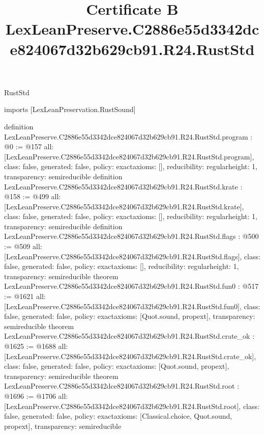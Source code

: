 \begin{lexlean}{RustStd}
\title{Certificate B LexLeanPreserve.C2886e55d3342dce824067d32b629cb91.R24.RustStd}
\begin{coremodule}
imports [LexLeanPreservation.RustSound]

definition LexLeanPreserve.C2886e55d3342dce824067d32b629cb91.R24.RustStd.program : @0 := @157 {
  all: [LexLeanPreserve.C2886e55d3342dce824067d32b629cb91.R24.RustStd.program],
  class: false,
  generated: false,
  policy: exact{axioms: []},
  reducibility: regular{height: 1},
  transparency: semireducible
}
definition LexLeanPreserve.C2886e55d3342dce824067d32b629cb91.R24.RustStd.krate : @158 := @499 {
  all: [LexLeanPreserve.C2886e55d3342dce824067d32b629cb91.R24.RustStd.krate],
  class: false,
  generated: false,
  policy: exact{axioms: []},
  reducibility: regular{height: 1},
  transparency: semireducible
}
definition LexLeanPreserve.C2886e55d3342dce824067d32b629cb91.R24.RustStd.flags : @500 := @509 {
  all: [LexLeanPreserve.C2886e55d3342dce824067d32b629cb91.R24.RustStd.flags],
  class: false,
  generated: false,
  policy: exact{axioms: []},
  reducibility: regular{height: 1},
  transparency: semireducible
}
theorem LexLeanPreserve.C2886e55d3342dce824067d32b629cb91.R24.RustStd.fun0 : @517 := @1621 {
  all: [LexLeanPreserve.C2886e55d3342dce824067d32b629cb91.R24.RustStd.fun0],
  class: false,
  generated: false,
  policy: exact{axioms: [Quot.sound, propext]},
  transparency: semireducible
}
theorem LexLeanPreserve.C2886e55d3342dce824067d32b629cb91.R24.RustStd.crate_ok : @1625 := @1688 {
  all: [LexLeanPreserve.C2886e55d3342dce824067d32b629cb91.R24.RustStd.crate_ok],
  class: false,
  generated: false,
  policy: exact{axioms: [Quot.sound, propext]},
  transparency: semireducible
}
theorem LexLeanPreserve.C2886e55d3342dce824067d32b629cb91.R24.RustStd.root : @1696 := @1706 {
  all: [LexLeanPreserve.C2886e55d3342dce824067d32b629cb91.R24.RustStd.root],
  class: false,
  generated: false,
  policy: exact{axioms: [Classical.choice, Quot.sound, propext]},
  transparency: semireducible
}


\end{coremodule}
\end{lexlean}
